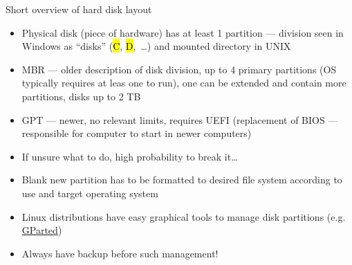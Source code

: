 \documentclass[compress, ucs, xelatex, 11pt, xcolor=svgnames,
  hyperref={
    bookmarks=true,
    unicode=true,
    colorlinks=true,
    pdftitle={Linux, command line and MetaCentrum},
    plainpages=false,
    pdfauthor={Vojtech Zeisek},
    pdfsubject={Course about use of Linux command line, writing shell scripts and using MetaCentrum of CESNET},
    pdfcreator={XeLaTeX},
    pdfkeywords={Linux, GNU, BASH, shell, command line, MetaCentrum},
    linkcolor=DarkRed,
    anchorcolor=DarkBlue,
    citecolor=Indigo,
    filecolor=NavyBlue,
    menucolor=DarkMagenta,
    urlcolor=DarkBlue,
    pdftex},
  url={hyphens, lowtilde} %
  ]{beamer}
\renewcommand{\texttt}[1]{\hl{\ttfamily #1}}
\begin{document}
\begin{frame}{Short overview of hard disk layout}
  \begin{itemize}
    \item Physical disk (piece of hardware) has at least 1 partition --- division seen in Windows as ``disks'' (\texttt{C}, \texttt{D},~\ldots) and mounted directory in UNIX
    \item MBR --- older description of disk division, up to 4 primary partitions (OS typically requires at leas one to run), one can be extended and contain more partitions, disks up to 2 TB
    \item GPT --- newer, no relevant limits, requires UEFI (replacement of BIOS --- responsible for computer to start in newer computers)
    \item If unsure what to do, high probability to break it\ldots
    \item Blank new partition has to be formatted to desired file system according to use and target operating system
    \item Linux distributions have easy graphical tools to manage disk partitions (e.g. \href{https://gparted.org/}{GParted})
    \item Always have backup before such management!
  \end{itemize}
\end{frame}
\end{document}
